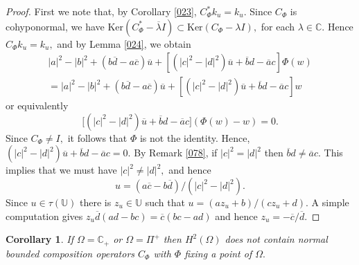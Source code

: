 \documentclass[11pt]{amsart}%
\newtheorem{cor}[thm]{Corollary}
\theoremstyle{definition}
\theoremstyle{remark}
\numberwithin{equation}{section}
\begin{document}
\begin{proof}
First we note that, by Corollary \ref{023}, $C_{\Phi}^{\ast}k_{u}=k_{u}.$
Since $C_{\Phi}$ is cohyponormal, we have $\mathrm{Ker}(C_{\Phi}^{*}%
-\overline{\lambda}I)\subset\mathrm{Ker}(C_{\Phi}-\lambda I),$ for each
$\lambda\in\mathbb{C}.$ Hence
$C_{\Phi}k_{u}=k_{u},$ and by Lemma \ref{024}, we obtain
\begin{gather*}
|a|^{2}-|b|^{2}+(b\overline{d}-a\overline{c})\overline{u}+[(|c|^{2}%
-|d|^{2})\overline{u}+\overline{b}d-\overline{a}c]\Phi(w)\\
=|a|^{2}-|b|^{2}+(b\overline{d}-a\overline{c})\overline{u}+[(|c|^{2}%
-|d|^{2})\overline{u}+\overline{b}d-\overline{a}c]w
\end{gather*}
or equivalently
\[
\lbrack(|c|^{2}-|d|^{2})\overline{u}+\overline{b}d-\overline{a}c](\Phi
(w)-w)=0.
\]
Since $C_{\Phi}\neq I,$ it follows that $\Phi$ is not the identity. Hence,
$(|c|^{2}-|d|^{2})\overline{u}+\overline{b}d-\overline{a}c=0.$ By Remark
\ref{078}, if $|c|^{2}=|d|^{2}$ then $\overline{b}d\neq\overline{a}c.$ This
implies that we must have $|c|^{2}\neq|d|^{2},$ and hence
\[
u=(a\overline{c}-b\overline{d})/(|c|^{2}-|d|^{2}).
\]
Since $u\in\tau(\mathbb{U})$ there is $z_{u}\in\mathbb{U}$ such that
$u=(az_{u}+b)/(cz_{u}+d).$ A simple computation gives $z_{u}\overline
{d}(ad-bc)=\overline{c}(bc-ad)$ and hence $z_{u}=-\overline{c}/\overline{d}.$
\end{proof}

\begin{cor}
If $\Omega=\mathbb{C}_{+}$ or $\Omega=\Pi^{+}$ then $H^{2}(\Omega)$ does not
contain normal bounded composition operators $C_{\Phi}$ with $\Phi$ fixing a
point of $\Omega.$
\end{cor}
\end{document}
